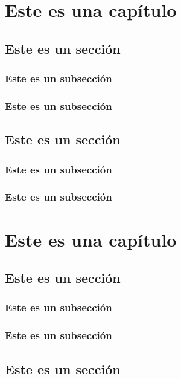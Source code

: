 \documentclass[11pt,oneside]{book}
\begin{document}


\tableofcontents

\chapter{Este es una capítulo}
\section{Este es un sección}
\subsection{Este es un subsección}
\lipsum[1-3]

\subsection{Este es un subsección}
\lipsum[1-2]

\section{Este es un sección}
\subsection{Este es un subsección}
\lipsum[1-1]
\subsection{Este es un subsección}
\lipsum[1-2]


\chapter{Este es una capítulo}
\section{Este es un sección}
\subsection{Este es un subsección}
\lipsum[1-3]

\subsection{Este es un subsección}
\lipsum[1-2]

\section{Este es un sección}
\end{document}
